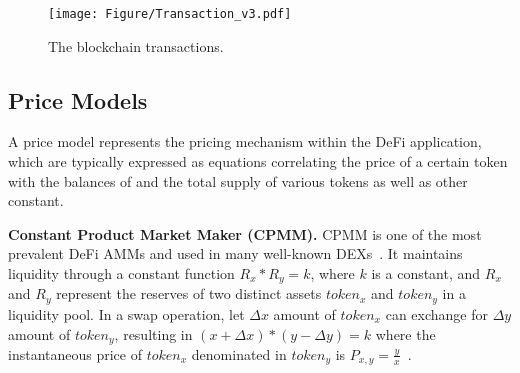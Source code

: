 \begin{figure}[!t]
     \centering
     \texttt{[image: Figure/Transaction\_v3.pdf]}
     \vspace{-1ex}
     \caption{The blockchain transactions.}
     \label{fig:transaction}
\end{figure}



\subsection{Price Models}
\label{sec:backg_priceModel}

A price model represents the pricing mechanism within the DeFi application, which are typically expressed as equations correlating the price of a certain token with the balances of and the total supply of various tokens as well as other constant. 


\noindent\textbf{Constant Product Market Maker (CPMM).}
CPMM is one of the most prevalent DeFi AMMs and used in many well-known DEXs~\cite{Uniswap,PancakeSwap}. It maintains liquidity through a constant function $R_x*R_y=k$,
where $k$ is a constant, and $R_x$ and $R_y$ represent the reserves of two distinct assets $token_x$ and $token_y$ in a liquidity pool. In a swap operation, let $\Delta x$ amount of $token_x$ can exchange for $\Delta y$ amount of $token_y$, resulting in $(x+\Delta x)*(y-\Delta y)=k$ where the instantaneous price of $token_x$ denominated in $token_y$ is $P_{x,y} = \frac{y}{x}$~\cite{DeFiRanger23,gogol2024sok}.


